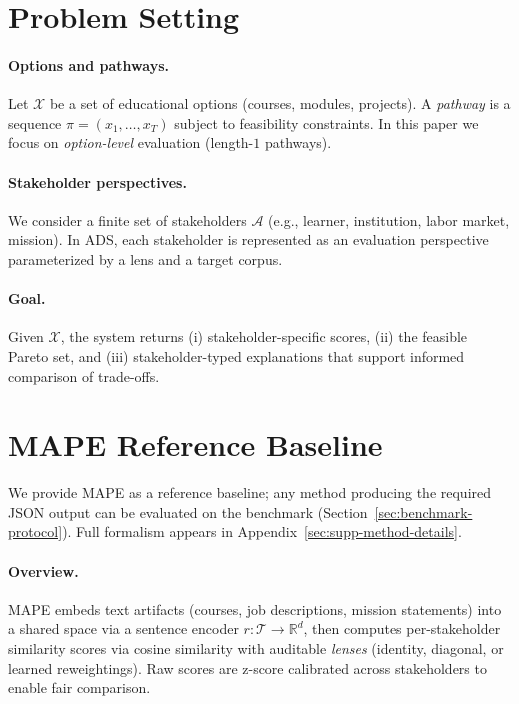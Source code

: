 \documentclass[sigconf,review]{acmart}
\newcommand{\ADS}{\textsc{ADS}\xspace}
\newcommand{\MAPE}{\textsc{MAPE}\xspace}
\begin{document}



\section{Problem Setting}
\label{sec:setting}

\paragraph{Options and pathways.}
Let $\mathcal{X}$ be a set of educational options (courses, modules, projects). A \emph{pathway} is a sequence $\pi=(x_1,\dots,x_T)$ subject to feasibility constraints. In this paper we focus on \emph{option-level} evaluation (length-$1$ pathways).

\paragraph{Stakeholder perspectives.}
We consider a finite set of stakeholders $\mathcal{A}$ (e.g., learner, institution, labor market, mission). In \ADS, each stakeholder is represented as an evaluation perspective parameterized by a lens and a target corpus.

\paragraph{Goal.}
Given $\mathcal{X}$, the system returns (i) stakeholder-specific scores, (ii) the feasible Pareto set, and (iii) stakeholder-typed explanations that support informed comparison of trade-offs.


\section{\MAPE Reference Baseline}
\label{sec:method}

We provide \MAPE as a reference baseline; any method producing the required JSON output can be evaluated on the benchmark (Section~\ref{sec:benchmark-protocol}). Full formalism appears in Appendix~\ref{sec:supp-method-details}.

\paragraph{Overview.}
\MAPE embeds text artifacts (courses, job descriptions, mission statements) into a shared space via a sentence encoder $r:\mathcal{T}\to\mathbb{R}^d$, then computes per-stakeholder similarity scores via cosine similarity with auditable \emph{lenses} (identity, diagonal, or learned reweightings). Raw scores are z-score calibrated across stakeholders to enable fair comparison.
\end{document}
